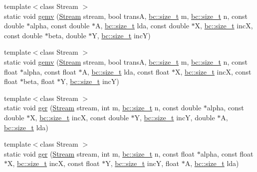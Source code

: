 \begin{DoxyCompactItemize}
\item 
{\footnotesize template$<$class Stream $>$ }\\static void \hyperlink{structbc_1_1blas_1_1BLAS_3_01host__tag_01_4_a19e15b20d59f7b6aa132be3afba78a88}{gemv} (\hyperlink{classbc_1_1streams_1_1Stream}{Stream} stream, bool transA, \hyperlink{namespacebc_aaf8e3fbf99b04b1b57c4f80c6f55d3c5}{bc\+::size\+\_\+t} m, \hyperlink{namespacebc_aaf8e3fbf99b04b1b57c4f80c6f55d3c5}{bc\+::size\+\_\+t} n, const double $\ast$alpha, const double $\ast$A, \hyperlink{namespacebc_aaf8e3fbf99b04b1b57c4f80c6f55d3c5}{bc\+::size\+\_\+t} lda, const double $\ast$X, \hyperlink{namespacebc_aaf8e3fbf99b04b1b57c4f80c6f55d3c5}{bc\+::size\+\_\+t} incX, const double $\ast$beta, double $\ast$Y, \hyperlink{namespacebc_aaf8e3fbf99b04b1b57c4f80c6f55d3c5}{bc\+::size\+\_\+t} incY)
\item 
{\footnotesize template$<$class Stream $>$ }\\static void \hyperlink{structbc_1_1blas_1_1BLAS_3_01host__tag_01_4_abbac6084a0a50374a81fe79e3ad303c4}{gemv} (\hyperlink{classbc_1_1streams_1_1Stream}{Stream} stream, bool transA, \hyperlink{namespacebc_aaf8e3fbf99b04b1b57c4f80c6f55d3c5}{bc\+::size\+\_\+t} m, \hyperlink{namespacebc_aaf8e3fbf99b04b1b57c4f80c6f55d3c5}{bc\+::size\+\_\+t} n, const float $\ast$alpha, const float $\ast$A, \hyperlink{namespacebc_aaf8e3fbf99b04b1b57c4f80c6f55d3c5}{bc\+::size\+\_\+t} lda, const float $\ast$X, \hyperlink{namespacebc_aaf8e3fbf99b04b1b57c4f80c6f55d3c5}{bc\+::size\+\_\+t} incX, const float $\ast$beta, float $\ast$Y, \hyperlink{namespacebc_aaf8e3fbf99b04b1b57c4f80c6f55d3c5}{bc\+::size\+\_\+t} incY)
\item 
{\footnotesize template$<$class Stream $>$ }\\static void \hyperlink{structbc_1_1blas_1_1BLAS_3_01host__tag_01_4_a19490f63f183da7d30a2e6bf5cf03a5e}{ger} (\hyperlink{classbc_1_1streams_1_1Stream}{Stream} stream, int m, \hyperlink{namespacebc_aaf8e3fbf99b04b1b57c4f80c6f55d3c5}{bc\+::size\+\_\+t} n, const double $\ast$alpha, const double $\ast$X, \hyperlink{namespacebc_aaf8e3fbf99b04b1b57c4f80c6f55d3c5}{bc\+::size\+\_\+t} incX, const double $\ast$Y, \hyperlink{namespacebc_aaf8e3fbf99b04b1b57c4f80c6f55d3c5}{bc\+::size\+\_\+t} incY, double $\ast$A, \hyperlink{namespacebc_aaf8e3fbf99b04b1b57c4f80c6f55d3c5}{bc\+::size\+\_\+t} lda)
\item 
{\footnotesize template$<$class Stream $>$ }\\static void \hyperlink{structbc_1_1blas_1_1BLAS_3_01host__tag_01_4_ace9dcdd952c9215795acd4fda5188636}{ger} (\hyperlink{classbc_1_1streams_1_1Stream}{Stream} stream, int m, \hyperlink{namespacebc_aaf8e3fbf99b04b1b57c4f80c6f55d3c5}{bc\+::size\+\_\+t} n, const float $\ast$alpha, const float $\ast$X, \hyperlink{namespacebc_aaf8e3fbf99b04b1b57c4f80c6f55d3c5}{bc\+::size\+\_\+t} incX, const float $\ast$Y, \hyperlink{namespacebc_aaf8e3fbf99b04b1b57c4f80c6f55d3c5}{bc\+::size\+\_\+t} incY, float $\ast$A, \hyperlink{namespacebc_aaf8e3fbf99b04b1b57c4f80c6f55d3c5}{bc\+::size\+\_\+t} lda)

\end{DoxyCompactItemize}
